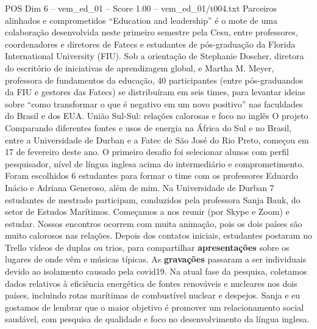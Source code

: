 \begin{textsample}{POS Dim 6 – vem\_ed\_01 – Score 1.00 – vem\_ed\_01/t004.txt}  \label{ex:f6_pos_074}
Parceiros alinhados e comprometidos “Education and leadership” é o mote de uma colaboração desenvolvida neste primeiro semestre pela Cesu, entre professores, coordenadores e diretores de Fatecs e estudantes de pós-graduação da Florida International University (FIU).
Sob a orientação de Stephanie Doscher, diretora do escritório de iniciativas de aprendizagem global, e Martha M.
Meyer, professora de fundamentos da educação, 40 participantes (entre pós-graduandos da FIU e gestores das Fatecs) se distribuíram em seis times, para levantar ideias sobre “como transformar o que é negativo em um novo positivo” nas faculdades do Brasil e dos EUA.
União Sul-Sul: relações calorosas e foco no inglês O projeto Comparando diferentes fontes e usos de energia na África do Sul e no Brasil, entre a Universidade de Durban e a Fatec de São José do Rio Preto, começou em 17 de fevereiro deste ano.
O primeiro desafio foi selecionar alunos com perfil pesquisador, nível de língua inglesa acima do intermediário e comprometimento.
Foram escolhidos 6 estudantes para formar o time com os professores Eduardo Inácio e Adriana Generoso, além de mim.
Na Universidade de Durban 7 estudantes de mestrado participam, conduzidos pela professora Sanja Bauk, do setor de Estudos Marítimos.
Começamos a nos reunir (por Skype e Zoom) e estudar.
Nossos encontros ocorrem com muita animação, pois os dois países são muito calorosos nas relações.
Depois dos contatos iniciais, estudantes postaram no Trello vídeos de duplas ou trios, para compartilhar \textbf{apresentações} sobre os lugares de onde vêm e músicas típicas.
As \textbf{gravações} passaram a ser individuais devido ao isolamento causado pela covid19.
Na atual fase da pesquisa, coletamos dados relativos à eficiência energética de fontes renováveis e nucleares nos dois países, incluindo rotas marítimas de combustível nuclear e despejos.
Sanja e eu gostamos de lembrar que o maior objetivo é promover um relacionamento social saudável, com pesquisa de qualidade e foco no desenvolvimento da língua inglesa.

\end{textsample}

